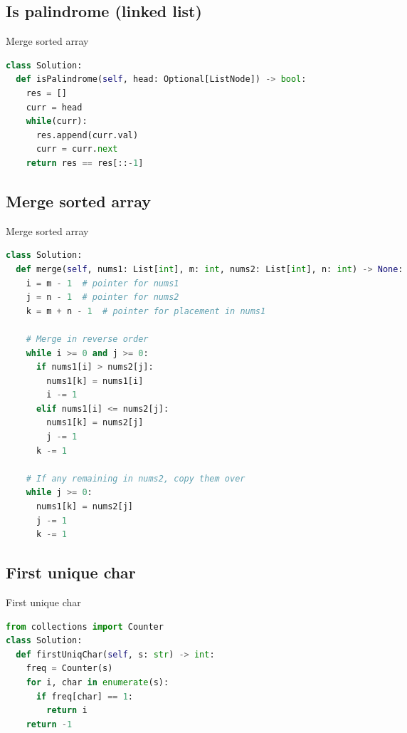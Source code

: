 \documentclass[a4paper,12pt]{article}
\begin{document}
\begin{multicols}{2}
\subsection{Is palindrome (linked list)}

\begin{mycode}[label={lst:merge-sorted-array}]{Merge sorted array}
\begin{lstlisting}[language=Python]
class Solution:
  def isPalindrome(self, head: Optional[ListNode]) -> bool:
    res = []
    curr = head
    while(curr):
      res.append(curr.val)
      curr = curr.next
    return res == res[::-1]
\end{lstlisting}
\end{mycode}

\subsection{Merge sorted array}

\begin{mycode}[label={lst:merge-sorted-array}]{Merge sorted array}
\begin{lstlisting}[language=Python]
class Solution:
  def merge(self, nums1: List[int], m: int, nums2: List[int], n: int) -> None:
    i = m - 1  # pointer for nums1
    j = n - 1  # pointer for nums2
    k = m + n - 1  # pointer for placement in nums1

    # Merge in reverse order
    while i >= 0 and j >= 0:
      if nums1[i] > nums2[j]:
        nums1[k] = nums1[i]
        i -= 1
      elif nums1[i] <= nums2[j]:
        nums1[k] = nums2[j]
        j -= 1
      k -= 1

    # If any remaining in nums2, copy them over
    while j >= 0:
      nums1[k] = nums2[j]
      j -= 1
      k -= 1
\end{lstlisting}
\end{mycode}

\subsection{First unique char}

\begin{mycode}[label={lst:first-unique-char}]{First unique char}
\begin{lstlisting}[language=Python]
from collections import Counter
class Solution:
  def firstUniqChar(self, s: str) -> int:
    freq = Counter(s)
    for i, char in enumerate(s):
      if freq[char] == 1:
        return i
    return -1
\end{lstlisting}
\end{mycode}


\end{multicols}
\end{document}
